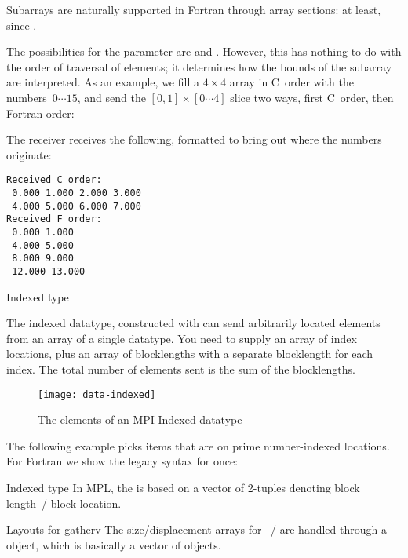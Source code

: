 Subarrays are naturally supported in Fortran through array sections:
at least, since .

The possibilities for the  parameter are
 and .
However, this has nothing to do with the order of traversal of elements;
it determines how the bounds of the subarray are interpreted.
As an example, we fill a $4\times 4$ array in C~order with the numbers~$0\cdots15$,
and send the $[0,1]\times [0\cdots4]$ slice two ways, 
first C~order, then Fortran order:
%

The receiver receives the following, formatted to bring out
where the numbers originate:
\begin{verbatim}
Received C order:
 0.000 1.000 2.000 3.000
 4.000 5.000 6.000 7.000
Received F order:
 0.000 1.000
 4.000 5.000
 8.000 9.000
 12.000 13.000
\end{verbatim}

 {Indexed type}
\label{sec:data:indexed}

The indexed datatype, constructed with 
can send arbitrarily located elements from an array of a single datatype.
You need to supply an array of index locations, plus an array of blocklengths
with a separate blocklength for each index. The total number of elements sent
is the sum of the blocklengths.

\begin{figure}[t]
  \texttt{[image: data-indexed]}
  \caption{The elements of an MPI Indexed datatype}
  \label{fig:data-indexed}
\end{figure}

The following example picks items that are on prime number-indexed
locations.
%
For Fortran we show the legacy syntax for once:
%
%

\begin{mplnote}{Indexed type}
  In \ac{MPL}, the  is based on a vector
  of 2-tuples denoting block length~/ block location.
\end{mplnote}

\begin{mplnote}{Layouts for gatherv}
  The size/displacement arrays for ~/
   are handled through a
   object, which is basically a vector of
   objects.
\end{mplnote}

